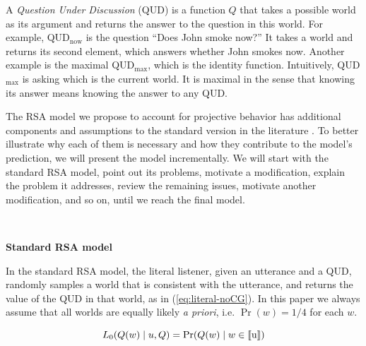 A \emph{Question Under Discussion} (QUD) is a function $Q$ that takes a possible world as 
 its argument and returns the answer to the question in this world.
For example, QUD$_\textrm{now}$ is the question ``Does John smoke now?'' 
It takes a world and returns its second element, which answers whether 
 John smokes now. 
Another example is the maximal QUD$_\textrm{max}$, which is the identity function. 
Intuitively, QUD$_\textrm{max}$ is asking which is the current world.
It is maximal in the sense that knowing its answer means knowing the answer to 
 any QUD.
 
The RSA model we propose to account for projective behavior has additional 
 components and assumptions to the standard version in the literature
 \cite{FrankGoodman2012:Predicting-Pragmatic-Reasoning-,GoodmanStuhlmuller2013:Knowledge-and-I}.
To better illustrate why each of them is necessary and how they contribute to 
 the model's prediction, we will present the model incrementally. 
We will start with the standard RSA model, point out its problems, motivate 
 a modification, explain the problem it addresses, review the remaining issues, 
 motivate another modification, and so on, until we reach the final model.

\ 

\noindent\textbf{Standard RSA model}

In the standard RSA model, the literal listener, given an utterance and a QUD, 
 randomly samples a world that is consistent with the utterance, 
 and returns the value of the QUD in that world, as in (\ref{eq:literal-noCG}). 
In this paper we always assume that all worlds are equally likely \emph{a priori}, 
 i.e. $\Pr(w)=1/4$ for each $w$.

\begin{equation}
L_0(Q(w) \mid u, Q) = \Pr(Q(w) \mid w \in \llbracket \text{u} \rrbracket) \label{eq:literal-noCG}
\end{equation}
 

